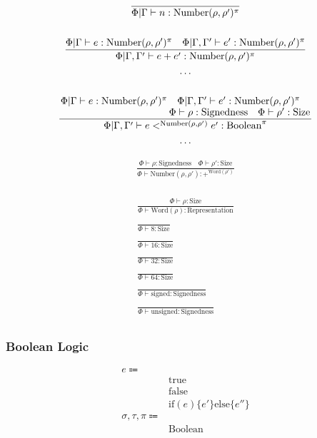 \documentclass {article}
\begin{document}
\begin{gather*}
\frac
{}
{\Phi | \Gamma \vdash n : \text{Number}(\rho, \rho')^\pi} \\
\\
\frac
{\Phi | \Gamma \vdash e : \text{Number}(\rho, \rho')^\pi \quad \Phi | \Gamma, \Gamma' \vdash e' : \text{Number}(\rho, \rho')^\pi}
{\Phi | \Gamma, \Gamma' \vdash e + e' : \text{Number}(\rho, \rho')^\pi} \\
\dots \\
\\
\frac
{\splitfrac{\Phi | \Gamma \vdash e : \text{Number}(\rho, \rho')^\pi \quad \Phi | \Gamma, \Gamma' \vdash e' : \text{Number}(\rho, \rho')^\pi}
{\Phi \vdash \rho : \text{Signedness} \quad \Phi \vdash \rho' : \text{Size}}}
{\Phi | \Gamma, \Gamma' \vdash e <^{\text{Number}(\rho, \rho')} e' : \text{Boolean}^\pi} \\
\dots
\end{gather*}

\begin{gather*}
\frac
{\Phi \vdash \rho : \text{Signedness} \quad \Phi \vdash \rho' : \text{Size}}
{\Phi \vdash \text{Number} (\rho, \rho') : +^ {\text{Word} (\rho')} } \\
\end{gather*}

\begin{gather*}
\frac
{\Phi \vdash \rho : \text{Size}}
{\Phi \vdash \text{Word} (\rho) : \text{Representation}} \\
\\
\frac
{}
{\Phi \vdash 8 : \text{Size}} \\
\\
\frac
{}
{\Phi \vdash 16 : \text{Size}} \\
\\
\frac
{}
{\Phi \vdash 32 : \text{Size}} \\
\\
\frac
{}
{\Phi \vdash 64 : \text{Size}} \\
\\
\frac
{}
{\Phi \vdash \text{signed} : \text{Signedness}} \\
\\
\frac
{}
{\Phi \vdash \text{unsigned} : \text{Signedness}} \\
\end{gather*}

\subsubsection{Boolean Logic}
\begin{align*}
e \Coloneqq & \\
& \text{true} \\
& \text{false} \\
& \text{if} (e) \{ e' \} \text{else} \{ e'' \} \\
\sigma, \tau, \pi \Coloneqq & \\
& \text{Boolean}
\end{align*}
\end{document}
